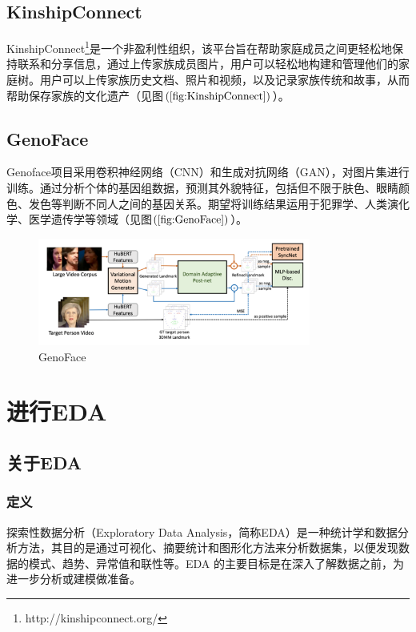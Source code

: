 \documentclass[UTF8]{ctexart}
\begin{document}
\subsection{KinshipConnect}
KinshipConnect\footnote{http://kinshipconnect.org/}是一个非盈利性组织，该平台旨在帮助家庭成员之间更轻松地保持联系和分享信息，通过上传家族成员图片，用户可以轻松地构建和管理他们的家庭树。用户可以上传家族历史文档、照片和视频，以及记录家族传统和故事，从而帮助保存家族的文化遗产（见图$\left(\ref{fig:KinshipConnect}\right)$）。

\subsection{GenoFace}
Genoface项目采用卷积神经网络（CNN）和生成对抗网络（GAN），对图片集进行训练。通过分析个体的基因组数据，预测其外貌特征，包括但不限于肤色、眼睛颜色、发色等判断不同人之间的基因关系。期望将训练结果运用于犯罪学、人类演化学、医学遗传学等领域（见图$\left(\ref{fig:GenoFace}\right)$）。

\begin{figure}[!ht]
  \centering
  \includegraphics[width=0.8\textwidth]{GenoFace.png}
  \caption{GenoFace}
  \label{fig:GenoFace}
\end{figure}

\section{进行EDA}
\subsection{关于EDA}
\subsubsection{定义}
探索性数据分析（Exploratory Data Analysis，简称EDA）是一种统计学和数据分析方法，其目的是通过可视化、摘要统计和图形化方法来分析数据集，以便发现数据的模式、趋势、异常值和联性等。EDA 的主要目标是在深入了解数据之前，为进一步分析或建模做准备。
\end{document}
